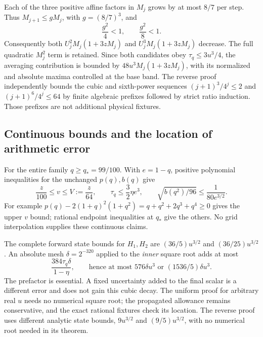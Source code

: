 Each of the three positive affine factors in $M_j$ grows by at most $8/7$ per step. Thus $M_{j+1}\le gM_j$, with $g=(8/7)^3$, and
\begin{equation}
 \frac{g^2}{4}<1,\qquad\frac{g^2}{8}<1.
 \label{eq:ai4-growing-averaging}
\end{equation}
Consequently both $U_j^2M_j(1+3zM_j)$ and $U_j^3M_j(1+3zM_j)$ decrease. The full quadratic $M_j^2$ term is retained. Since both candidates obey $\tau_q\le3u^3/4$, the averaging contribution is bounded by $48u^3M_j(1+3zM_j)$, with its normalized and absolute maxima controlled at the base band. The reverse proof independently bounds the cubic and sixth-power sequences $(j+1)^3/4^j\le2$ and $(j+1)^6/4^j\le64$ by finite algebraic prefixes followed by strict ratio induction. Those prefixes are not additional physical fixtures.

\subsection{Continuous bounds and the location of arithmetic error}
For the entire family $q\ge q_*=99/100$. With $e=1-q$, positive polynomial inequalities for the unchanged $p(q),b(q)$ give
\begin{equation}
 \frac z{100}\le v\le V:=\frac z{64},\qquad
 \tau_q\le\frac32\eta e^3,\qquad
 \sqrt{b(q^2)/96}\le\frac1{80e^{3/2}}.
 \label{eq:ai4-continuous}
\end{equation}
For example $p(q)-2(1+q)^2(1+q^2)=q+q^2+2q^3+q^4\ge0$ gives the upper $v$ bound; rational endpoint inequalities at $q_*$ give the others. No grid interpolation supplies these continuous claims.

The complete forward state bounds for $H_1,H_2$ are $(36/5)u^{3/2}$ and $(36/25)u^{3/2}$. An absolute mesh $\delta=2^{-320}$ applied to the \emph{inner} square root adds at most
\begin{equation}
 \frac{384\tau_q\delta}{1-\eta},\qquad
 \text{hence at most }576\delta u^3\text{ or }(1536/5)\delta u^3.
 \label{eq:ai4-rounding}
\end{equation}
The prefactor is essential. A fixed uncertainty added to the final scalar is a different error and does not gain this cubic decay. The uniform proof for arbitrary real $u$ needs no numerical square root; the propagated allowance remains conservative, and the exact rational fixtures check its location. The reverse proof uses different analytic state bounds, $9u^{3/2}$ and $(9/5)u^{3/2}$, with no numerical root needed in its theorem.

